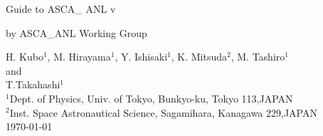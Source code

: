 \begin{titlepage}
\begin{center}
\begin{Huge}
Guide to ASCA\_ ANL {\large v\ANLversion}\\
\end{Huge}
\vspace{5mm}

\begin{LARGE}
by ASCA\_ANL Working Group \\
\end{LARGE}
\vspace{5mm}

\begin{large}
H. Kubo$^{1}$, M. Hirayama$^{1}$, Y. Ishisaki$^{1}$, K. Mitsuda$^{2}$, 
M. Tashiro$^{1}$\\
 and \\
T.Takahashi$^{1}$\\
\vspace{5mm}
$^{1}$Dept. of Physics, Univ. of Tokyo, Bunkyo-ku, Tokyo 113,JAPAN\\
$^{2}$Inst. Space Astronautical Science, Sagamihara, Kanagawa 229,JAPAN\\
\vspace{5mm}
\today\\
\end{large}
\end{center}
\end{titlepage}

\setcounter{page}{1}


\newpage

\tableofcontents
\listoffigures

\clearpage
{}
\setcounter{page}{1}







